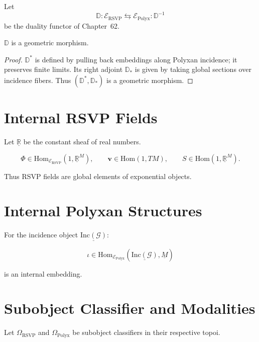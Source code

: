 Let
\[
\mathbb{D} : \mathscr{E}_{\mathrm{RSVP}} \leftrightarrows
               \mathscr{E}_{\mathrm{Polyx}} : \mathbb{D}^{-1}
\]
be the duality functor of Chapter~62.

\begin{proposition}
$\mathbb{D}$ is a geometric morphism.
\end{proposition}

\begin{proof}
$\mathbb{D}^\ast$ is defined by pulling back embeddings along Polyxan incidence; it preserves finite limits.  
Its right adjoint $\mathbb{D}_\ast$ is given by taking global sections over incidence fibers.  
Thus $(\mathbb{D}^\ast,\mathbb{D}_\ast)$ is a geometric morphism.
\end{proof}

\section{Internal RSVP Fields}

Let $\underline{\mathbb{R}}$ be the constant sheaf of real numbers.

\begin{definition}
\[
\Phi \in \mathrm{Hom}_{\mathscr{E}_{\mathrm{RSVP}}}(1,\underline{\mathbb{R}}^M),
\qquad
\mathbf{v} \in \mathrm{Hom}(1,TM),
\qquad
S \in \mathrm{Hom}(1,\underline{\mathbb{R}}^M).
\]
\end{definition}

Thus RSVP fields are global elements of exponential objects.

\section{Internal Polyxan Structures}

For the incidence object $\underline{\mathrm{Inc}(\mathcal{G})}$:

\[
\iota \in \mathrm{Hom}_{\mathscr{E}_{\mathrm{Polyx}}}
 ( \underline{\mathrm{Inc}(\mathcal{G})},
   \underline{M} )
\]

is an internal embedding.

\section{Subobject Classifier and Modalities}

Let $\Omega_{\mathrm{RSVP}}$ and $\Omega_{\mathrm{Polyx}}$ be subobject classifiers in their respective topoi.

